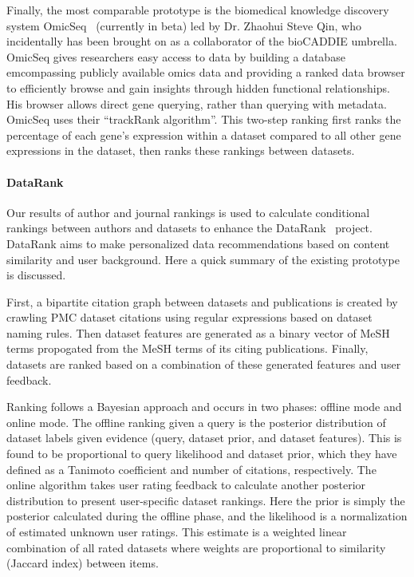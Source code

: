 Finally, the most comparable prototype is the biomedical knowledge discovery system OmicSeq~\cite{omicseq} (currently in beta) led by Dr. Zhaohui Steve Qin, who incidentally has been brought on as a collaborator of the bioCADDIE umbrella. OmicSeq gives researchers easy access to data by building a database emcompassing publicly available omics data and providing a ranked data browser to efficiently browse and gain insights through hidden functional relationships. His browser allows direct gene querying, rather than querying with metadata. OmicSeq uses their ``trackRank algorithm''. This two-step ranking first ranks the percentage of each gene's expression within a dataset compared to all other gene expressions in the dataset, then ranks these rankings between datasets.


\paragraph{DataRank}
Our results of author and journal rankings is used to calculate conditional rankings between authors and datasets to enhance the DataRank~\cite{datarank} project. DataRank aims to make personalized data recommendations based on content similarity and user background. Here a quick summary of the existing prototype is discussed.

First, a bipartite citation graph between datasets and publications is created by crawling PMC dataset citations using regular expressions based on dataset naming rules. Then dataset features are generated as a binary vector of MeSH terms propogated from the MeSH terms of its citing publications. Finally, datasets are ranked based on a combination of these generated features and user feedback. 

Ranking follows a Bayesian approach and occurs in two phases: offline mode and online mode. The offline ranking given a query is the posterior distribution of dataset labels given evidence (query, dataset prior, and dataset features). This is found to be proportional to query likelihood and dataset prior, which they have defined as a Tanimoto coefficient and number of citations, respectively. The online algorithm takes user rating feedback to calculate another posterior distribution to present user-specific dataset rankings. Here the prior is simply the posterior calculated during the offline phase, and the likelihood is a normalization of estimated unknown user ratings. This estimate is a weighted linear combination of all rated datasets where weights are proportional to similarity (Jaccard index) between items.

